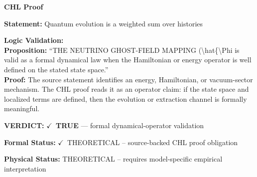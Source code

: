 \vspace{0.45em}
\noindent\textbf{CHL Proof}\par
\textbf{Statement:} Quantum evolution is a weighted sum over histories

\textbf{Logic Validation:}\\
\textbf{Proposition:} ``THE NEUTRINO GHOST-FIELD MAPPING (\textbackslash{}hat\{\textbackslash{}Phi is valid as a formal dynamical law when the
Hamiltonian or energy operator is well defined on the stated state space.''\\
\textbf{Proof:} The source statement identifies an energy, Hamiltonian, or vacuum-sector mechanism. The
CHL proof reads it as an operator claim: if the state space and localized terms are
defined, then the evolution or extraction channel is formally meaningful.

\textbf{VERDICT:} \ensuremath{\checkmark}\ \textbf{TRUE} --- formal dynamical-operator validation

\textbf{Formal Status:} \ensuremath{\checkmark}\ THEORETICAL -- source-backed CHL proof obligation

\textbf{Physical Status:} THEORETICAL -- requires model-specific empirical interpretation
\par\vspace{0.45em}
\par
\ifTZPDarkEdition
{}
\fi
\endgroup
\endgroup
